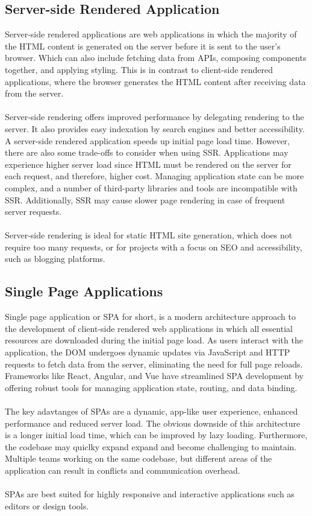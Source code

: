 \subsection{Server-side Rendered Application}
Server-side rendered applications are web applications in which the majority of the HTML content is generated on the server before it is sent to the user's browser. Which can also include fetching data from APIs, composing components together, and applying styling. This is in contrast to client-side rendered applications, where the browser generates the HTML content after receiving data from the server.\\\\
Server-side rendering offers improved performance by delegating rendering to the server. It also provides easy indexation by search engines and better accessibility. A server-side rendered application speeds up initial page load time. However, there are also some trade-offs to consider when using SSR. Applications may experience higher server load since HTML must be rendered on the server for each request, and therefore, higher cost. Managing application state can be more complex, and a number of third-party libraries and tools are incompatible with SSR. Additionally, SSR may cause slower page rendering in case of frequent server requests.\\\\
Server-side rendering is ideal for static HTML site generation, which does not require too many requests, or for projects with a focus on SEO and accessibility, such as blogging platforms.

\subsection{Single Page Applications}
Single page application or SPA for short, is a modern architecture approach to the development of client-side rendered web applications in which all essential resources are downloaded during the initial page load. As users interact with the application, the DOM undergoes dynamic updates via JavaScript and HTTP requests to fetch data from the server, eliminating the need for full page reloads.  Frameworks like React, Angular, and Vue have streamlined SPA development by offering robust tools for managing application state, routing, and data binding. \\\\
The key adavtanges of SPAs are a dynamic, app-like user experience, enhanced performance and reduced server load. The obvious downside of this architecture is a longer initial load time, which can be improved by lazy loading. Furthermore, the codebase may quiclky expand expand and become challenging to maintain. Multiple teams working on the same codebase, but different areas of the application can result in conflicts and communication overhead. \\\\
SPAs are best suited for highly responsive and interactive applications such as editors or design tools.

